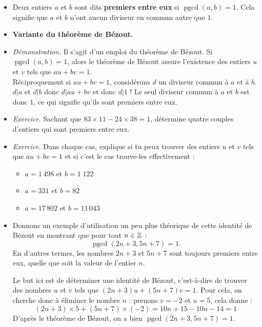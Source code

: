 \documentclass[11pt,class=report,crop=false]{standalone}
\newcommand{\pgcd}{\mathop{\mathrm{pgcd}}\nolimits}
\begin{document}
\begin{itemize}
    \item Deux entiers $a$ et $b$ sont dits \textbf{premiers entre eux} si $\pgcd(a,b)=1$.
    Cela signifie que $a$ et $b$ n'ont aucun diviseur en commun autre que $1$.
    
    \item \textbf{Variante du théorème de Bézout.}
    
    
    \item \emph{Démonstration.} Il s'agit d'un emploi du théorème de Bézout. Si $\pgcd(a,b)=1$, alors le théorème de Bézout assure l'existence des entiers $u$ et $v$ tels que $au+bv=1$.\\
    Réciproquement si $au+bv=1$, considérons $d$ un diviseur commun à $a$ et à $b$. $d|a$ et $d|b$ donc $d|au+bv$ et donc $d|1$ ! Le seul diviseur commun à $a$ et $b$ est donc $1$, ce qui signifie qu'ils sont premiers entre eux.
    
    \item \emph{Exercice.} Sachant que $83\times11-24\times38=1$, détermine quatre couples d'entiers qui sont premiers entre eux.
    
    \item \emph{Exercice.} Dans chaque cas, explique si tu peux trouver des entiers $u$ et $v$ tels que $au + bv=1$ et si c'est le cas trouve-les effectivement :
    \begin{itemize}
        \item $a=1\,498$ et $b=1\;122$
        \item $a=331$ et $b=82$
        \item $a=17 \,802$ et $b=11\, 043$             
    \end{itemize}

    \item Donnons un exemple d'utilisation un peu plus théorique de cette identité de Bézout en montrant que pour tout $n \in \mathbb{Z}$ :
    $$\pgcd(2n+3, 5n+7)=1.$$ 
    En d'autres termes, les nombres $2n+3$ et $5n+7$ sont toujours premiers entre eux, quelle que soit la valeur de l'entier $n$.
    
    Le but ici est de déterminer une identité de Bézout, c'est-à-dire de trouver des nombres $u$ et $v$ tels que $(2n+3)u+(5n+7)v=1$. Pour cela, on cherche donc à éliminer le nombre $n$ : prenons $v=-2$ et $u=5$, cela donne :
    $$(2n+3)\times5+(5n+7)\times(-2) = 10n+15-10n-14=1$$ 
    D'après le théorème de Bézout, on a bien $\pgcd(2n+3,5n+7)=1$.
\end{itemize}
\end{document}
